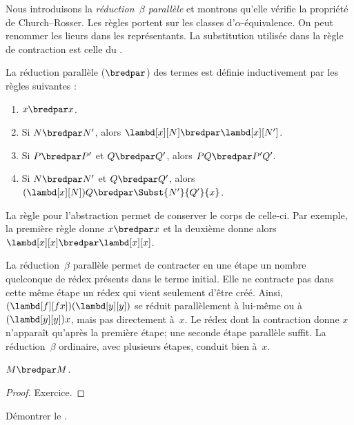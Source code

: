 \documentclass[../../../include/open-logic-section]{subfiles}
\begin{document}

Nous introduisons la \emph{réduction~$\beta$
parallèle} et montrons qu'elle vérifie la
propriété de Church--Rosser. Les règles portent
sur les classes d'$\alpha$-équivalence. On peut
renommer les lieurs dans les représentants.
La substitution utilisée dans la règle de
contraction est celle du .

\begin{defn}
La réduction parallèle ($\bredpar$) des
termes est définie inductivement par les
règles suivantes :
\begin{enumerate}
\item {} $x \bredpar x$.
\item {}
  Si $N \bredpar N'$, alors
  $\lambd[x][N] \bredpar \lambd[x][N']$.
\item {}
  Si $P \bredpar P'$ et $Q \bredpar Q'$,
  alors $PQ \bredpar P'Q'$.
\item {}
  Si $N \bredpar N'$ et $Q \bredpar Q'$,
  alors $(\lambd[x][N])Q \bredpar
  \Subst{N'}{Q'}{x}$.
\end{enumerate}
\end{defn}

La règle pour l'abstraction permet de conserver le corps
de celle-ci. Par exemple, la première règle donne
$x\bredpar x$ et la deuxième donne alors
$\lambd[x][x]\bredpar\lambd[x][x]$.

La réduction~$\beta$ parallèle permet de
contracter en une étape un nombre quelconque
de rédex présents dans le terme initial.
Elle ne contracte pas dans cette même étape
un rédex qui vient seulement d'être créé.
Ainsi, $(\lambd[f][fx])(\lambd[y][y])$
se réduit parallèlement à lui-même ou à
$(\lambd[y][y])x$, mais pas directement
à~$x$. Le rédex dont la contraction donne
$x$ n'apparaît qu'après la première étape;
une seconde étape parallèle suffit.
La réduction~$\beta$ ordinaire, avec
plusieurs étapes, conduit bien à~$x$.

\begin{thm}
$M \bredpar M$.
\end{thm}

\begin{proof}
Exercice.
\end{proof}

\begin{prob}
Démontrer le .
\end{prob}
\end{document}

